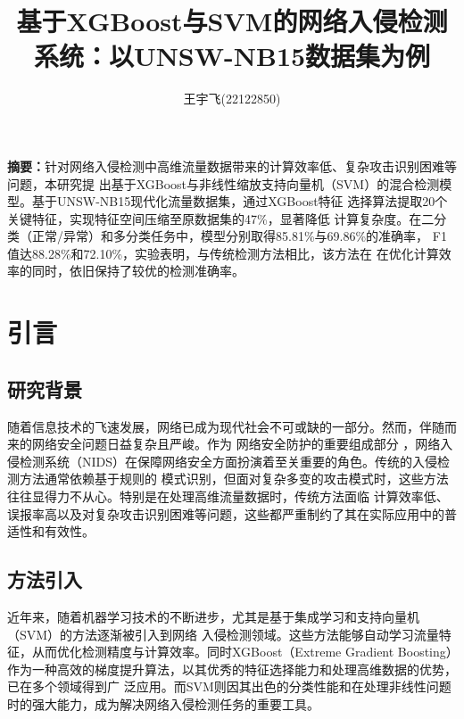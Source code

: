 \documentclass{article}
\title{\textbf{基于XGBoost与SVM的网络入侵检测系统：以UNSW-NB15数据集为例}}
\author{
王宇飞(22122850)
}
\begin{document}
 \songti


\date{}
\maketitle


\begin{center}
\setlength{\textwidth}{15cm}
\parbox{\textwidth}{
\textbf{摘要：}针对网络入侵检测中高维流量数据带来的计算效率低、复杂攻击识别困难等问题，本研究提
出基于XGBoost与非线性缩放支持向量机（SVM）的混合检测模型。基于UNSW-NB15现代化流量数据集，通过XGBoost特征
选择算法提取20个关键特征，实现特征空间压缩至原数据集的47\%，显著降低
计算复杂度。在二分类（正常/异常）和多分类任务中，模型分别取得85.81\%与69.86\%的准确率，
F1值达88.28\%和72.10\%，实验表明，与传统检测方法相比，该方法在
在优化计算效率的同时，依旧保持了较优的检测准确率。

  }
\end{center}

\section{引言}
\subsection{研究背景}
随着信息技术的飞速发展，网络已成为现代社会不可或缺的一部分。然而，伴随而来的网络安全问题日益复杂且严峻。作为
网络安全防护的重要组成部分
，网络入侵检测系统（NIDS）在保障网络安全方面扮演着至关重要的角色。传统的入侵检测方法通常依赖基于规则的
模式识别，但面对复杂多变的攻击模式时，这些方法往往显得力不从心。特别是在处理高维流量数据时，传统方法面临
计算效率低、误报率高以及对复杂攻击识别困难等问题，这些都严重制约了其在实际应用中的普适性和有效性。

\subsection{方法引入}
近年来，随着机器学习技术的不断进步，尤其是基于集成学习和支持向量机（SVM）的方法逐渐被引入到网络
入侵检测领域。这些方法能够自动学习流量特征，从而优化检测精度与计算效率。同时XGBoost（Extreme Gradient
 Boosting）作为一种高效的梯度提升算法\cite{ref7}，以其优秀的特征选择能力和处理高维数据的优势，已在多个领域得到广
 泛应用。而SVM则因其出色的分类性能和在处理非线性问题时的强大能力\cite{ref8}，成为解决网络入侵检测任务的重要工具。
\end{document}
